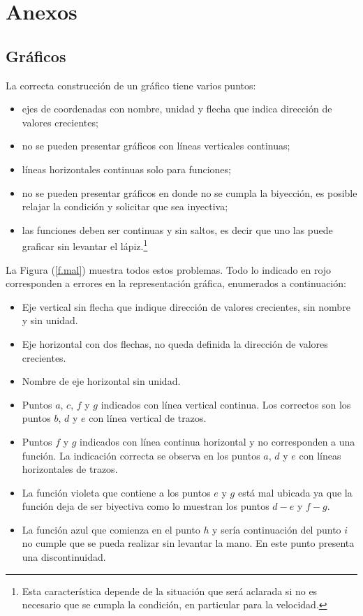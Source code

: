 \section{Anexos}

\subsection{Gráficos}
\label{c.graf}

La correcta construcción de un gráfico tiene varios puntos: 
\begin{itemize}
  \item ejes de coordenadas con nombre, unidad y flecha que indica dirección
    de valores crecientes;
  \item no se pueden presentar gráficos con líneas verticales continuas;
  \item líneas horizontales continuas solo para funciones; 
  \item no se pueden presentar gráficos en donde no se cumpla la biyección, es
    posible relajar la condición y solicitar que sea inyectiva;
  \item las funciones deben ser continuas y sin saltos, es decir que uno las
    puede graficar sin levantar el lápiz.\footnote{Esta característica depende
    de la situación que será aclarada si no es necesario que se cumpla la
    condición, en particular para la velocidad.}
\end{itemize}
La Figura (\ref{f.mal}) muestra todos estos problemas. Todo lo indicado en
{\color{red}rojo} corresponden a errores en la representación gráfica,
enumerados a continuación:
\begin{itemize}
  \item Eje vertical sin flecha que indique dirección de valores crecientes, sin
    nombre y sin unidad.
  \item Eje horizontal con dos flechas, no queda definida la dirección de
    valores crecientes.
  \item Nombre de eje horizontal sin unidad.
  \item Puntos $a$, $c$, $f$ y $g$ indicados con línea vertical continua. Los
    correctos son los puntos $b$, $d$ y $e$ con línea vertical de trazos.
  \item Puntos $f$ y $g$ indicados con línea continua horizontal y no
    corresponden a una función. La indicación correcta se observa en los puntos
    $a$, $d$ y $e$ con líneas horizontales de trazos.
  \item La función violeta que contiene a los puntos $e$ y $g$ está mal ubicada
    ya que la función deja de ser biyectiva como lo muestran los puntos $d-e$ y
    $f-g$.
  \item La función azul que comienza en el punto $h$ y sería continuación del
    punto $i$ no cumple que se pueda realizar sin levantar la mano. En este
    punto presenta una discontinuidad.
\end{itemize}

